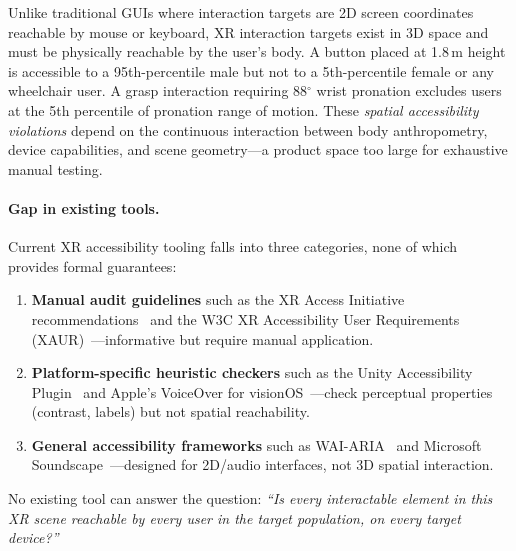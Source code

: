 \documentclass[11pt,letterpaper]{article}
\begin{document}
Unlike traditional GUIs where interaction targets are 2D screen coordinates reachable by mouse or keyboard, XR interaction targets exist in 3D space and must be physically reachable by the user's body.
A button placed at 1.8\,m height is accessible to a 95th-percentile male but not to a 5th-percentile female or any wheelchair user.
A grasp interaction requiring 88$^\circ$ wrist pronation excludes users at the 5th percentile of pronation range of motion.
These \emph{spatial accessibility violations} depend on the continuous interaction between body anthropometry, device capabilities, and scene geometry---a product space too large for exhaustive manual testing.

\paragraph{Gap in existing tools.}
Current XR accessibility tooling falls into three categories, none of which provides formal guarantees:
\begin{enumerate}[leftmargin=*,nosep]
  \item \textbf{Manual audit guidelines} such as the XR Access Initiative recommendations~\cite{xraccess2021} and the W3C XR Accessibility User Requirements (XAUR)~\cite{w3c-xaur}---informative but require manual application.
  \item \textbf{Platform-specific heuristic checkers} such as the Unity Accessibility Plugin~\cite{unity-a11y} and Apple's VoiceOver for visionOS~\cite{apple-voiceover}---check perceptual properties (contrast, labels) but not spatial reachability.
  \item \textbf{General accessibility frameworks} such as WAI-ARIA~\cite{wai-aria} and Microsoft Soundscape~\cite{ms-soundscape}---designed for 2D/audio interfaces, not 3D spatial interaction.
\end{enumerate}
No existing tool can answer the question: \emph{``Is every interactable element in this XR scene reachable by every user in the target population, on every target device?''}
\end{document}
